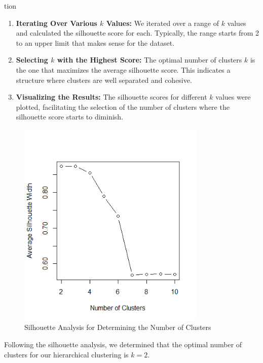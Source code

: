 tion\documentclass[8pt]{article}
\begin{document}
\begin{enumerate}
\begin{enumerate}
    \item \textbf{Iterating Over Various \( k \) Values:} We iterated over a range of \( k \) values and calculated the silhouette score for each. Typically, the range starts from 2 to an upper limit that makes sense for the dataset.
    
    \item \textbf{Selecting \( k \) with the Highest Score:} The optimal number of clusters \( k \) is the one that maximizes the average silhouette score. This indicates a structure where clusters are well separated and cohesive.
    
    \item \textbf{Visualizing the Results:} The silhouette scores for different \( k \) values were plotted, facilitating the selection of the number of clusters where the silhouette score starts to diminish.
\end{enumerate}

\begin{figure}[h]
    \centering
    \includegraphics[width=0.8\textwidth]{unsupervised_figures/silhouette_method.png}
    \caption{Silhouette Analysis for Determining the Number of Clusters}
    \label{fig:silhouette_analysis}
\end{figure}

Following the silhouette analysis, we determined that the optimal number of clusters for our hierarchical clustering is \( k = 2 \). 


\end{enumerate}
\end{document}
